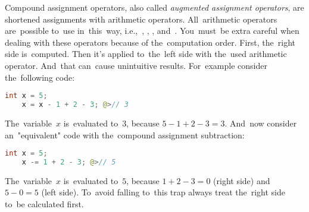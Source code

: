Compound assignment operators, also called \textit{augmented assignment operators}, are shortened assignments with arithmetic operators.
All~arithmetic operators are~possible to~use in~this~way, \mbox{i.e., \itqs{+=}}, \mbitqs{-=}, \mbitqs{$\star$=}, \mbitqs{/=} \mbox{and \itqs{\%=}}.
You~must~be extra careful when dealing with these operators because of the~computation order.
First, the~right side is~computed.
Then it's applied to~the~left side with the~used arithmetic operator.
And~that can~cause unintuitive results.
For~example consider the~following code:
\begin{lstlisting}[language=Java, frame=no]
    int x = 5;
    x = x - 1 + 2 - 3; @>// 3
\end{lstlisting}

\noindent The~variable~$x$ is~evaluated to~$3$, because $5-1+2-3=3$.
And~now consider an~"equivalent" code with the~compound assignment subtraction:
\begin{lstlisting}[language=Java, frame=no]
    int x = 5;
    x -= 1 + 2 - 3; @>// 5
\end{lstlisting}

\noindent The~variable~$x$ is~evaluated to~$5$, because $1+2-3=0$ (right side) and~$5-0=5$ (left side).
To~avoid falling to~this trap always treat the~right side to~be calculated first.
